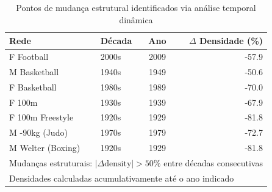 \begin{table}[H]
\centering
\small
\caption{Pontos de mudança estrutural identificados via análise temporal dinâmica}
\label{tab:temporal_change_points}
\begin{tabular}{llcr}
\hline
\textbf{Rede} & \textbf{Década} & \textbf{Ano} & \textbf{$\Delta$ Densidade (\%)} \\
\hline
F Football & 2000s & 2009 & -57.9 \\
M Basketball & 1940s & 1949 & -50.6 \\
F Basketball & 1980s & 1989 & -70.0 \\
F 100m & 1930s & 1939 & -67.9 \\
F 100m Freestyle & 1920s & 1929 & -81.8 \\
M -90kg (Judo) & 1970s & 1979 & -72.7 \\
M Welter (Boxing) & 1920s & 1929 & -81.8 \\
\hline
\multicolumn{4}{l}{\footnotesize Mudanças estruturais: $|\Delta \text{density}| > 50\%$ entre décadas consecutivas} \\
\multicolumn{4}{l}{\footnotesize Densidades calculadas acumulativamente até o ano indicado} \\
\end{tabular}
\end{table}
